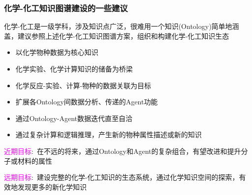 \frame
{
	\frametitle{化学-化工知识图谱建设的一些建议}
	化学-化工是一级学科，涉及知识点广泛，很难用一个知识\textrm{(Ontology)}简单地涵盖，建议参照上述化学-化工知识图谱方案，组织和构建化学-化工知识生态
	\begin{itemize}
		\item 以化学物种数据为核心知识
		\item 化学实验、化学计算知识的储备为桥梁
		\item 化学反应-实验、计算-物种的数据关联为目标
		\item 扩展各\textrm{Ontology}间数据分析、传递的\textrm{Agent}功能
		\item 通过\textrm{Ontology}-\textrm{Agent}数据迭代直至自洽
		\item 通过复杂计算和逻辑推理，产生新的物种属性描述或新的知识
	\end{itemize}
	\textcolor{magenta}{近期目标}:~在不远的将来，通过\textrm{Ontology}和\textrm{Agent}的复杂组合，有望改进和提升分子或材料的属性

\textcolor{magenta}{远期目标}:~建设完整的化学-化工知识的生态系统，通过化学知识空间的探索，有效地发现更多的新化学知识
}
